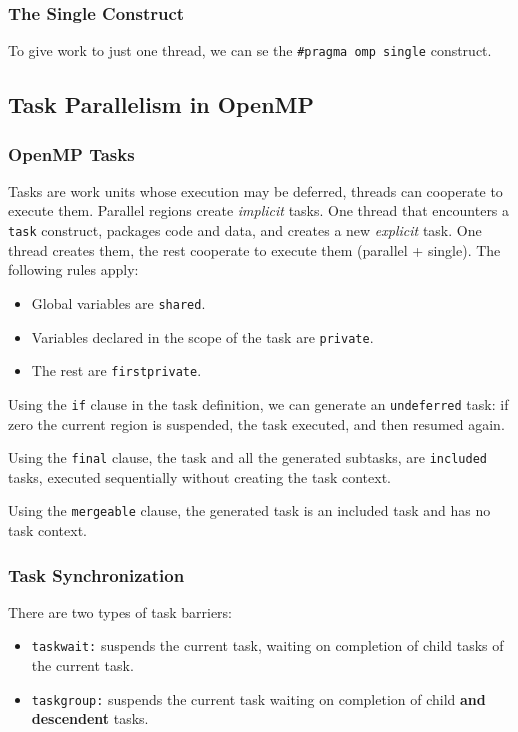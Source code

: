 \subsubsection{The Single Construct}

To give work to just one thread, we can se the \texttt{\#pragma omp single} construct.

\subsection{Task Parallelism in OpenMP}

\subsubsection{OpenMP Tasks}
Tasks are work units whose execution may be deferred, threads can cooperate to execute them.
Parallel regions create \textit{implicit} tasks.
One thread that encounters a \texttt{task} construct, packages code and data, and creates a new \textit{explicit} task.
One thread creates them, the rest cooperate to execute them (parallel + single).
The following rules apply:
\begin{itemize}
    \item Global variables are \texttt{shared}.
    \item Variables declared in the scope of the task are \texttt{private}.
    \item The rest are \texttt{firstprivate}.
\end{itemize}

Using the \texttt{if} clause in the task definition, we can generate an \texttt{undeferred} task: if zero the current region is suspended, the task executed, and then resumed again.

Using the \texttt{final} clause, the task and all the generated subtasks, are \texttt{included} tasks, executed sequentially without creating the task context.

Using the \texttt{mergeable} clause, the generated task is an included task and has no task context.

\subsubsection{Task Synchronization}

There are two types of task barriers:
\begin{itemize}
    \item \texttt{taskwait:} suspends the current task, waiting on completion of child tasks of the current task.
    \item \texttt{taskgroup:} suspends the current task waiting on completion of child \textbf{and descendent} tasks.
\end{itemize}
